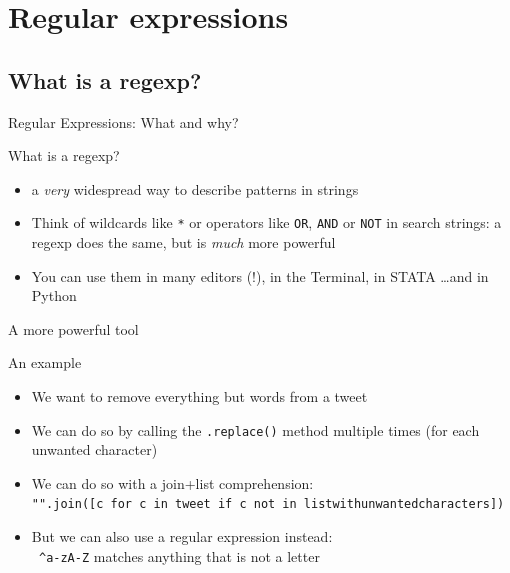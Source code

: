 \section{Regular expressions}

\subsection{What is a regexp?}
\begin{frame}{Regular Expressions: What and why?}
\begin{block}{What is a regexp?}
\begin{itemize}
\item<1-> a \emph{very} widespread way to describe patterns in strings
\item<2-> Think of wildcards like {\tt{*}} or operators like {\tt{OR}}, {\tt{AND}} or {\tt{NOT}} in search strings: a regexp does the same, but is \emph{much} more powerful
\item<3-> You can use them in many editors (!), in the Terminal, in STATA \ldots and in Python
\end{itemize}
\end{block}
\end{frame}

\begin{frame}{A more powerful tool}
\begin{block}{An example}
\begin{itemize}
\item We want to remove everything but words from a tweet
\item We can do so by calling the \texttt{.replace()} method multiple times (for each unwanted character)
\item We can do so with a join+list comprehension:\\  \texttt{"".join([c for c in tweet if c not in listwithunwantedcharacters])}
\item But we can also use a regular expression instead: \\
{\tt{ \lbrack \^{}a-zA-Z\rbrack}}  matches anything that is not a letter
\end{itemize}
\end{block}
\end{frame}

